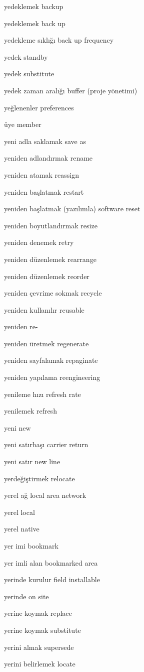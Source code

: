\documentclass[12pt,fleqn]{article}\usepackage{../../common}
\begin{document}
yedeklemek backup

yedeklemek back up

yedekleme sıklığı back up frequency

yedek standby

yedek substitute

yedek zaman aralığı buffer (proje yönetimi)

yeğlenenler preferences

üye member

yeni adla saklamak save as

yeniden adlandırmak rename

yeniden atamak reassign

yeniden başlatmak restart

yeniden başlatmak (yazılımla) software reset

yeniden boyutlandırmak resize

yeniden denemek retry

yeniden düzenlemek rearrange

yeniden düzenlemek reorder

yeniden çevrime sokmak recycle

yeniden kullanılır reusable

yeniden re-

yeniden üretmek regenerate

yeniden sayfalamak repaginate

yeniden yapılama reengineering

yenileme hızı refresh rate

yenilemek refresh

yeni new

yeni satırbaşı carrier return

yeni satır new line

yerdeğiştirmek relocate

yerel ağ local area network

yerel local

yerel native

yer imi bookmark

yer imli alan bookmarked area

yerinde kurulur field installable

yerinde on site

yerine koymak replace

yerine koymak substitute

yerini almak supersede

yerini belirlemek locate
\end{document}
